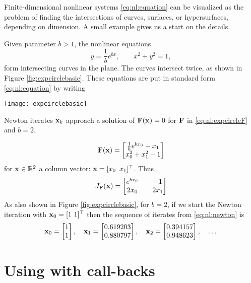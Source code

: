 Finite-dimensional nonlinear systems \eqref{eq:nl:equation} can be visualized as the problem of finding the intersections of curves, surfaces, or hypersurfaces, depending on dimension.  A small example gives us a start on the details.

\clearpage
\noindent\hrulefill
\begin{example}  Given parameter $b > 1$, the nonlinear equations
    $$y = \frac{1}{b} e^{bx}, \qquad x^2+y^2 = 1,$$
form intersecting curves in the plane.  The curves intersect twice, as shown in Figure \ref{fig:expcirclebasic}.  These equations are put in standard form \eqref{eq:nl:equation} by writing

\begin{marginfigure}
\texttt{[image: expcirclebasic]}

\medskip
\caption{Newton iterates $\mathbf{x}_k$ approach a solution of $\mathbf{F}(\mathbf{x})=0$ for $\mathbf{F}$ in \eqref{eq:nl:expcircleF} and $b=2$.}
\label{fig:expcirclebasic}
\end{marginfigure}

\begin{equation}
\label{eq:nl:expcircleF}
\mathbf{F}(\mathbf{x}) = \begin{bmatrix}
           \frac{1}{b} e^{b x_0} - x_1 \\
           x_0^2 + x_1^2 - 1
           \end{bmatrix}
\end{equation}
for $\mathbf{x}\in \mathbb{R}^2$ a column vector: $\mathbf{x} = [x_0 \,\,\, x_1]^\top$.  Thus
\begin{equation}
\label{eq:nl:ecjacobian}
J_{\mathbf{F}}(\mathbf{x}) = \begin{bmatrix}
    e^{b x_0} & & -1 \\
    2 x_0   & & 2 x_1 \end{bmatrix}
\end{equation}
As also shown in Figure \ref{fig:expcirclebasic}, for $b=2$, if we start the Newton iteration with $\mathbf{x}_0 = [1 \,\, 1]^\top$ then the sequence of iterates from \eqref{eq:nl:newton} is
    $${\mathbf{x}}_{0} = \begin{bmatrix} 1 \\ 1 \end{bmatrix}, \quad {\mathbf{x}}_{1} = \begin{bmatrix} 0.619203 \\ 0.880797 \end{bmatrix}, \quad {\mathbf{x}}_{2} = \begin{bmatrix} 0.394157 \\ 0.948623 \end{bmatrix}, \quad \dots$$
\noindent\hrulefill
\end{example}


\section{Using \pSNES with call-backs} \label{sec:usingsnes}

